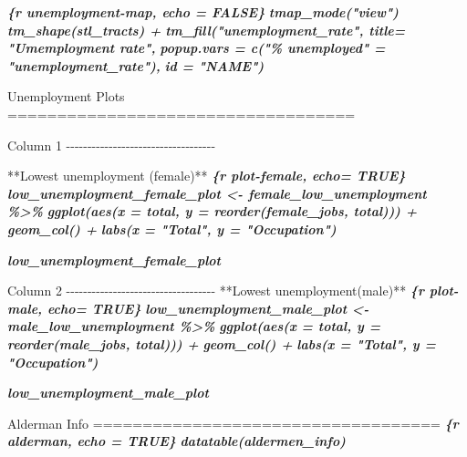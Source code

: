 \documentclass[
  krantz2]{krantz}
\makeatletter
\newenvironment{Shaded}{\begin{snugshade}}{\end{snugshade}}
\newcommand{\FunctionTok}[1]{\textcolor[rgb]{0,0,0}{#1}}
\newcommand{\InformationTok}[1]{\textcolor[rgb]{0.37,0.37,0.37}{\textbf{\textit{#1}}}}
\newcommand{\NormalTok}[1]{#1}
\newenvironment{kframe}{%
\medskip{}
\setlength{\fboxsep}{.8em}
 \def\at@end@of@kframe{}%
 \ifinner\ifhmode%
  \def\at@end@of@kframe{\end{minipage}}%
  \begin{minipage}{\columnwidth}%
 \fi\fi%
 \def\FrameCommand##1{\hskip\@totalleftmargin \hskip-\fboxsep
 \colorbox{shadecolor}{##1}\hskip-\fboxsep
     \hskip-\linewidth \hskip-\@totalleftmargin \hskip\columnwidth}%
 \MakeFramed {\advance\hsize-\width
   \@totalleftmargin\z@ \linewidth\hsize
   \@setminipage}}%
 {\par\unskip\endMakeFramed%
 \at@end@of@kframe}
\renewenvironment{Shaded}{\begin{kframe}}{\end{kframe}}
\makeatother
\begin{document}
\begin{Shaded}
\begin{Highlighting}[]
\InformationTok{\textasciigrave{}\textasciigrave{}\textasciigrave{}\{r unemployment{-}map, echo = FALSE\}}
\InformationTok{tmap\_mode("view")}
\InformationTok{tm\_shape(stl\_tracts) +}
\InformationTok{  tm\_fill("unemployment\_rate", title= "Umemployment rate",}
\InformationTok{          popup.vars = c("\% unemployed" = "unemployment\_rate"), }
\InformationTok{          id = "NAME")}

\InformationTok{\textasciigrave{}\textasciigrave{}\textasciigrave{}}

\NormalTok{Unemployment Plots}
\FunctionTok{===================================}


\NormalTok{Column 1}
\NormalTok{{-}{-}{-}{-}{-}{-}{-}{-}{-}{-}{-}{-}{-}{-}{-}{-}{-}{-}{-}{-}{-}{-}{-}{-}{-}{-}{-}{-}{-}{-}{-}{-}{-}{-}{-}}

\NormalTok{**Lowest unemployment (female)**}
\InformationTok{\textasciigrave{}\textasciigrave{}\textasciigrave{}\{r plot{-}female, echo= TRUE\}}
\InformationTok{low\_unemployment\_female\_plot \textless{}{-} female\_low\_unemployment \%\textgreater{}\%}
\InformationTok{  ggplot(aes(x = total, y = reorder(female\_jobs, total))) +}
\InformationTok{  geom\_col() +}
\InformationTok{  labs(x = "Total", y = "Occupation")}

\InformationTok{low\_unemployment\_female\_plot}
\InformationTok{\textasciigrave{}\textasciigrave{}\textasciigrave{}}


\NormalTok{Column 2}
\NormalTok{{-}{-}{-}{-}{-}{-}{-}{-}{-}{-}{-}{-}{-}{-}{-}{-}{-}{-}{-}{-}{-}{-}{-}{-}{-}{-}{-}{-}{-}{-}{-}{-}{-}{-}{-}}
\NormalTok{**Lowest unemployment(male)**}
\InformationTok{\textasciigrave{}\textasciigrave{}\textasciigrave{}\{r plot{-}male, echo= TRUE\}}
\InformationTok{low\_unemployment\_male\_plot \textless{}{-} male\_low\_unemployment \%\textgreater{}\%}
\InformationTok{  ggplot(aes(x = total, y = reorder(male\_jobs, total))) +}
\InformationTok{  geom\_col() +}
\InformationTok{  labs(x = "Total", y = "Occupation")}

\InformationTok{low\_unemployment\_male\_plot}
\InformationTok{\textasciigrave{}\textasciigrave{}\textasciigrave{}}


\NormalTok{Alderman Info}
\FunctionTok{===================================}
\InformationTok{\textasciigrave{}\textasciigrave{}\textasciigrave{}\{r alderman, echo = TRUE\}}
\InformationTok{datatable(aldermen\_info)}
\InformationTok{\textasciigrave{}\textasciigrave{}\textasciigrave{}}
\end{Highlighting}
\end{Shaded}
\end{document}
